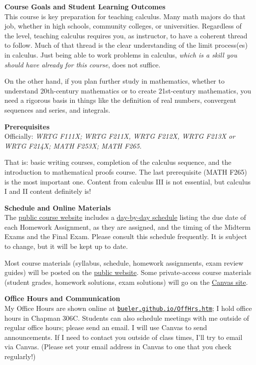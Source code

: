 \documentclass[12pt]{article}
\renewcommand{\emph}[1]{\textsf{\textbf{#1}}}
\newcommand{\localhead}[1]{\par\smallskip\textbf{#1} \smallskip\nobreak\\}%
\def\heading#1{\localhead{\large\emph{#1}}}
\begin{document}
\clearpage \newpage
\phantom{foo}
\heading{Course Goals and Student Learning Outcomes}
This course is key preparation for teaching calculus.  Many math majors do that job, whether in high schools, community colleges, or universities.  Regardless of the level, teaching calculus requires you, as instructor, to have a coherent thread to follow.  Much of that thread is the clear understanding of the limit process(es) in calculus.  Just being able to work problems in calculus, \textsl{which is a skill you should have already for this course}, does not suffice.

On the other hand, if you plan further study in mathematics, whether to understand 20th-century mathematics or to create 21st-century mathematics, you need a rigorous basis in things like the definition of real numbers, convergent sequences and series, and integrals.

\heading{Prerequisites}
Officially: \textsl{WRTG F111X; WRTG F211X, WRTG F212X, WRTG F213X or WRTG F214X; MATH F253X; MATH F265.}

That is: basic writing courses, completion of the calculus sequence, and the introduction to mathematical proofs course.  The last prerequisite (MATH F265) is the most important one.  Content from calculus III is not essential, but calculus I and II content definitely is!

\heading{Schedule and Online Materials}
The \href{https://bueler.github.io/real/}{public course website} includes a \href{https://bueler.github.io/real/assets/general/F25/schedule.pdf}{day-by-day schedule} listing the due date of each Homework Assignment, as they are assigned, and the timing of the Midterm Exams and the Final Exam.  Please consult this schedule frequently.  It is subject to change, but it will be kept up to date.

Most course materials (syllabus, schedule, homework assignments, exam review guides) will be posted on the \href{https://bueler.github.io/real/}{public website}.  Some private-access course materials (student grades, homework solutions, exam solutions) will go on the \href{https://canvas.alaska.edu/courses/27104}{Canvas site}.


\heading{Office Hours and Communication}
My Office Hours are shown online at \href{http://bueler.github.io/OffHrs.htm}{\texttt{bueler.github.io/OffHrs.htm}}; I hold office hours in Chapman 306C.  Students can also schedule meetings with me outside of regular office hours; please send an email.  I will use Canvas to send announcements.  If I need to contact you outside of class times, I'll try to email via Canvas.  (Please set your email address in Canvas to one that you check regularly!)
\end{document}
